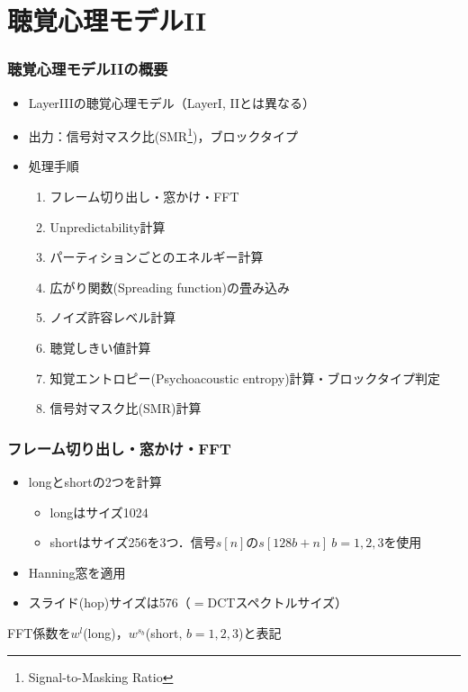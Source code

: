 \documentclass[14pt,xcolor=dvipsnames,table,dvipdfmx]{beamer}
\begin{document}
\section{聴覚心理モデルII}

\begin{frame}[c]
    \frametitle{聴覚心理モデルIIの概要}
    \begin{itemize}
        \item LayerIIIの聴覚心理モデル（LayerI, IIとは異なる）
        \item 出力：信号対マスク比(SMR\footnote{Signal-to-Masking Ratio})，ブロックタイプ
        \item 処理手順
            \begin{enumerate}
                \item フレーム切り出し・窓かけ・FFT
                \item Unpredictability計算
                \item パーティションごとのエネルギー計算
                \item 広がり関数(Spreading function)の畳み込み
                \item ノイズ許容レベル計算
                \item 聴覚しきい値計算
                \item 知覚エントロピー(Psychoacoustic entropy)計算・ブロックタイプ判定
                \item 信号対マスク比(SMR)計算
            \end{enumerate}
    \end{itemize}
\end{frame}

\begin{frame}[c]
    \frametitle{フレーム切り出し・窓かけ・FFT}
    \begin{itemize}
        \item longとshortの2つを計算
            \begin{itemize}
                \item longはサイズ1024
                \item shortはサイズ256を3つ．信号$s[n]$の$s[128b + n]\ b = 1,2,3$を使用
            \end{itemize}
        \item Hanning窓を適用
        \item スライド(hop)サイズは576（$=$DCTスペクトルサイズ）
    \end{itemize}
    FFT係数を$w^{l}$(long)，$w^{s_{b}}$(short, $b=1,2,3$)と表記
\end{frame}
\end{document}
